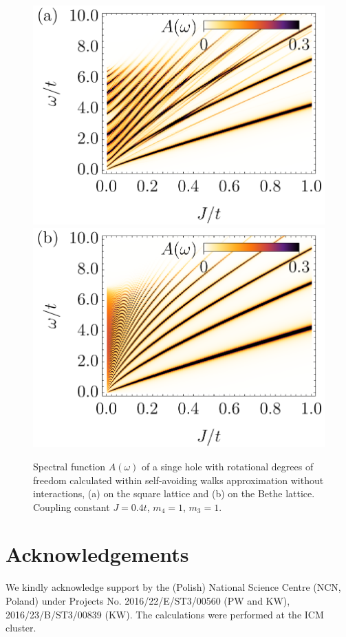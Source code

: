 \documentclass[11pt, a4paper, twocolumn]{article}
\begin{document}
\begin{figure}[ht!]
	\includegraphics[width=0.49\columnwidth]
	{./figures/square/[1, 1]_noint.png}
	\includegraphics[width=0.49\columnwidth]
	{./figures/bethe/[1, 1]_noint.png}
	\caption{
		Spectral function $A(\omega)$ of a singe hole with rotational degrees of freedom calculated within self-avoiding walks approximation without interactions, (a) on the square lattice and (b) on the Bethe lattice. Coupling constant $J=0.4t$, $m_4 = 1$, $m_3 = 1$.
	}
\end{figure}

\clearpage

\newpage

\section*{Acknowledgements}
We  kindly  acknowledge  support  by  the  (Polish)  National  Science  Centre  (NCN, Poland)  under  Projects  No. 2016/22/E/ST3/00560 (PW and KW), 2016/23/B/ST3/00839 (KW). The calculations were performed at the ICM cluster.
\end{document}
